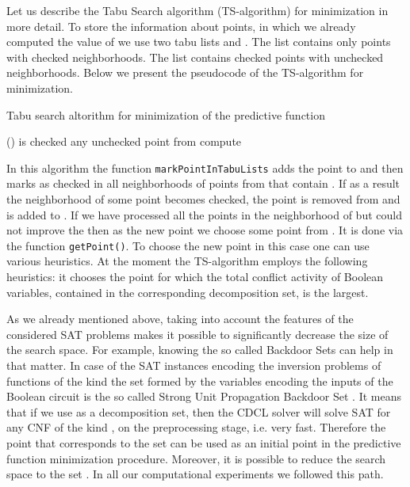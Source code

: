 \documentclass[runningheads,a4paper]{llncs}
\begin{document}
Let us describe the Tabu Search algorithm (TS-algorithm) for minimization  in more detail. To store the information about points, in which we already computed the value of  we use two tabu lists  and . The  list contains only points with checked neighborhoods. The  list contains checked points with unchecked neighborhoods. Below we present the pseudocode of the TS-algorithm for  minimization. 

\begin{algorithm}
 \DontPrintSemicolon
 \caption{Tabu search altorithm for minimization of the predictive function}
	\;
	 {
		\bestValueUpdated  \false\;
		\Repeat(){ is checked}{
			 any unchecked point from \;
			compute \;
			\markPointInTabuLists{} 
			\If{}{
				\;
				\bestValueUpdated  \true\;
			}
		}
		\lIf{\bestValueUpdated} {
			\;
		}
		\lElse{
			 \getPoint{}\;
		}
	}
\Return{}\;
\end{algorithm}

In this algorithm the function \texttt{markPointInTabuLists} adds the point  to  and then marks  as checked in all neighborhoods of points from  that contain . If as a result the neighborhood of some point  becomes checked, the point  is removed from  and is added to . If we have processed all the points in the neighborhood of  but could not improve the  then as the new point  we choose some point from . It is done via the function \texttt{getPoint()}. To choose the new point in this case one can use various heuristics. At the moment the TS-algorithm employs the following heuristics: it chooses the point for which the total conflict activity of Boolean variables, contained in the corresponding decomposition set, is the largest.

As we already mentioned above, taking into account the features of the considered SAT problems makes it possible to significantly decrease the size of the search space. For example, knowing the so called Backdoor Sets \cite{DBLP:conf/ijcai/WilliamsGS03} can help in that matter. In case of the SAT instances encoding the inversion problems of functions of the kind  the set  formed by the variables encoding the inputs of the Boolean circuit  is the so called Strong Unit Propagation Backdoor Set \cite{DBLP:journals/constraints/JarvisaloJ09}. It means that if we use  as a decomposition set, then the CDCL solver will solve SAT for any CNF of the kind ,  on the preprocessing stage, i.e. very fast. Therefore the point  that corresponds to the set  can be used as an initial point in the predictive function minimization procedure. Moreover, it is possible to reduce the search space to the set . In all our computational experiments we followed this path. 
\end{document}
